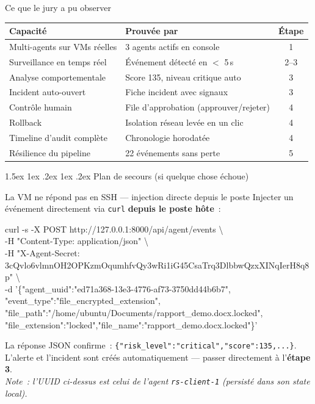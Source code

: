 \documentclass[a4paper,11pt]{article}
\makeatletter
\renewcommand{\section}{\@startsection{section}{1}{\z@}%
  {1.5ex \@plus 1ex \@minus .2ex}%
  {1ex \@plus .2ex}%
  {\large\bfseries\color{ifriblue}}}
\makeatother
\begin{document}
\begin{checkbox}{Ce que le jury a pu observer}
\renewcommand{\arraystretch}{1.2}
\begin{tabular}{@{}l l c@{}}
\toprule
\textbf{Capacité} & \textbf{Prouvée par} & \textbf{Étape} \\
\midrule
Multi-agents sur VMs réelles       & 3 agents actifs en console          & 1 \\
Surveillance en temps réel         & Événement détecté en $<$ 5\,s       & 2--3 \\
Analyse comportementale            & Score 135, niveau critique auto     & 3 \\
Incident auto-ouvert               & Fiche incident avec signaux         & 3 \\
Contrôle humain                    & File d'approbation (approuver/rejeter) & 4 \\
Rollback                           & Isolation réseau levée en un clic  & 4 \\
Timeline d'audit complète          & Chronologie horodatée              & 4 \\
Résilience du pipeline             & 22 événements sans perte            & 5 \\
\bottomrule
\end{tabular}
\end{checkbox}

\section{Plan de secours (si quelque chose échoue)}

\begin{warnbox}{La VM ne répond pas en SSH — injection directe depuis le poste}
Injecter un événement directement via \texttt{curl} \textbf{depuis le poste hôte}~:
\begin{cmdbox}
curl -s -X POST http://127.0.0.1:8000/api/agent/events \textbackslash\\
  -H "Content-Type: application/json" \textbackslash\\
  -H "X-Agent-Secret: 3cQvlo6vlmnOH2OPKzmOqumhfvQy3wRi1iG45CsaTrq3DlbbwQzxXINqIerH8q8p" \textbackslash\\
  -d '\{"agent\_uuid":"ed71a368-13e3-4776-af73-3750dd44b6b7",\\
        "event\_type":"file\_encrypted\_extension",\\
        "file\_path":"/home/ubuntu/Documents/rapport\_demo.docx.locked",\\
        "file\_extension":"locked","file\_name":"rapport\_demo.docx.locked"\}'
\end{cmdbox}
La réponse JSON confirme~: \texttt{\{"risk\_level":"critical","score":135,...\}}.\\
L'alerte et l'incident sont créés automatiquement --- passer directement à l'\textbf{étape 3}.\\[3pt]
\textit{Note~: l'UUID ci-dessus est celui de l'agent \texttt{rs-client-1} (persisté dans son state local).}
\end{warnbox}
\end{document}
